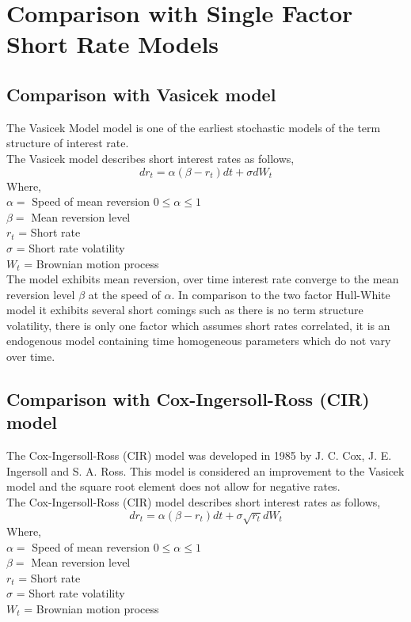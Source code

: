 \documentclass{article}
\begin{document}
\section{Comparison with Single Factor Short Rate Models
}

\subsection{Comparison with Vasicek model
}
The Vasicek Model \cite{Vas1} model is one of the earliest stochastic models of the term structure of interest rate.\\

The Vasicek model describes short interest rates as follows,
 \[
dr_t = \alpha(\beta - r_t) dt + \sigma dW_t
\]
Where,\\
$\alpha =$ Speed of mean reversion $0 \leq \alpha \leq 1 $ \\
$\beta =$ Mean reversion level  \\
$r_t$ = Short rate  \\
$\sigma$ = Short rate volatility \\
$W_t$ = Brownian motion process  \\

The model exhibits mean reversion, over time interest rate converge to the mean reversion level $\beta$ at the speed of $\alpha$.  In comparison to the two factor Hull-White model it exhibits several short comings such as there is no term structure volatility, there is only one factor which assumes short rates correlated, it is an endogenous model containing time homogeneous parameters which do not vary over time.


\subsection{Comparison with Cox-Ingersoll-Ross (CIR) model
}

The Cox-Ingersoll-Ross (CIR) model was developed in 1985 \cite{CIR1} by J. C. Cox, J. E. Ingersoll and S. A. Ross.  This model is considered an improvement to the Vasicek model and the square root element does not allow for negative rates.\\

The Cox-Ingersoll-Ross (CIR) model describes short interest rates as follows,
 \[
dr_t = \alpha(\beta - r_t) dt + \sigma \sqrt{r_t} dW_t
\]
Where,\\
$\alpha =$ Speed of mean reversion $0 \leq \alpha \leq 1 $ \\
$\beta =$ Mean reversion level  \\
$r_t$ = Short rate  \\
$\sigma$ = Short rate volatility \\
$W_t$ = Brownian motion process  \\
\end{document}
